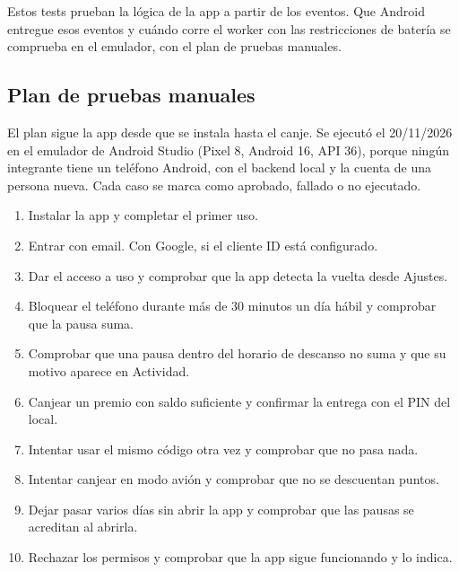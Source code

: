 Estos tests prueban la lógica de la app a partir de los eventos. Que Android entregue esos eventos y
cuándo corre el worker con las restricciones de batería se comprueba en el emulador, con el plan de
pruebas manuales.

\subsection{Plan de pruebas manuales}

El plan sigue la app desde que se instala hasta el canje. Se ejecutó el 20/11/2026 en el emulador de
Android Studio (Pixel 8, Android 16, API 36), porque ningún integrante tiene un teléfono Android, con el
backend local y la cuenta de una persona nueva. Cada caso se marca como aprobado, fallado o no ejecutado.

\begin{enumerate}
\item Instalar la app y completar el primer uso.
\item Entrar con email. Con Google, si el cliente ID está configurado.
\item Dar el acceso a uso y comprobar que la app detecta la vuelta desde Ajustes.
\item Bloquear el teléfono durante más de 30 minutos un día hábil y comprobar que la pausa suma.
\item Comprobar que una pausa dentro del horario de descanso no suma y que su motivo aparece en Actividad.
\item Canjear un premio con saldo suficiente y confirmar la entrega con el PIN del local.
\item Intentar usar el mismo código otra vez y comprobar que no pasa nada.
\item Intentar canjear en modo avión y comprobar que no se descuentan puntos.
\item Dejar pasar varios días sin abrir la app y comprobar que las pausas se acreditan al abrirla.
\item Rechazar los permisos y comprobar que la app sigue funcionando y lo indica.
\end{enumerate}

